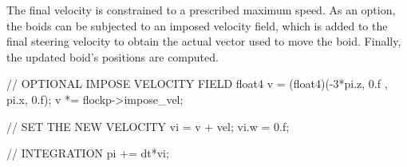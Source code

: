 The final velocity is constrained to a prescribed maximum speed. As an option, the boids can be subjected to an imposed velocity field, which is added to the final steering velocity to obtain the actual vector used to move the boid. Finally, the updated boid's positions are computed. 

\begin{cppcode}{0}
// OPTIONAL IMPOSE VELOCITY FIELD
float4 v = (float4)(-3*pi.z, 0.f , pi.x, 0.f);
v *= flockp->impose_vel;

// SET THE NEW VELOCITY
vi = v + vel;
vi.w = 0.f;

// INTEGRATION
pi += dt*vi; 
\end{cppcode}
\vspace{16pt}
 


